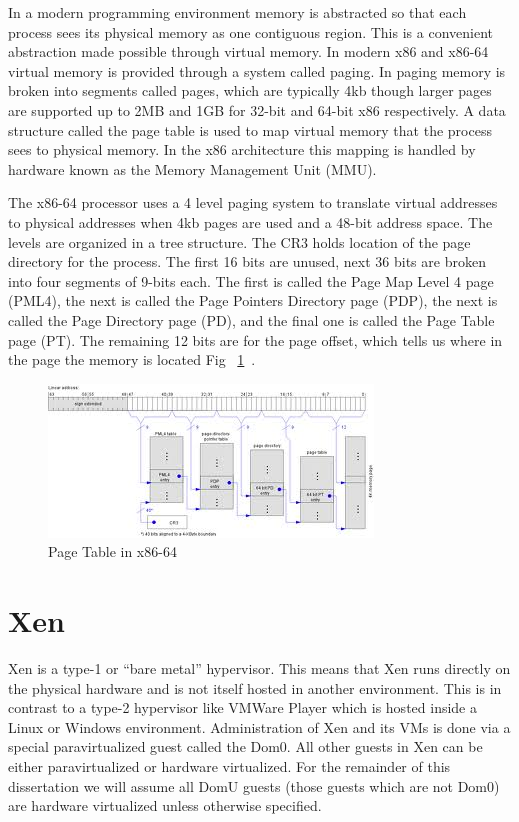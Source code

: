 In a modern programming environment memory is abstracted so that each process sees its physical memory as one contiguous region.  This is a convenient abstraction made possible through virtual memory. In modern x86 and x86-64 virtual memory is provided through a system called paging. In paging memory is broken into segments called pages, which are typically 4kb though larger pages are supported up to 2MB and 1GB for 32-bit and 64-bit x86 respectively. A data structure called the page table is used to map virtual memory that the process sees to physical memory. In the x86 architecture this mapping is handled by hardware known as the Memory Management Unit (MMU). 

The x86-64 processor uses a 4 level paging system to translate virtual addresses to physical addresses when 4kb pages are used and a 48-bit address space. The levels are organized in a tree structure. The CR3 holds location of the page directory for the process. The first 16 bits are unused, next 36 bits are broken into four segments of 9-bits each. The first is called the Page Map Level 4 page (PML4), the next is called the Page Pointers Directory page (PDP), the next is called the Page Directory page (PD), and the final one is called the Page Table page (PT). The remaining 12 bits are for the page offset, which tells us where in the page the memory is located Fig ~\ref{VirtPaging}~\cite{_file:x86_2009}. 

\begin{figure}\label{VirtPaging}
	  \centering
	  \includegraphics[width=\textwidth]{figures/PageTableDiagram.jpeg}
	  \caption{Page Table in x86-64 }
\end{figure}

\section{Xen}
Xen is a type-1 or ``bare metal'' hypervisor. This means that Xen runs directly on the physical hardware and is not itself hosted in another environment. This is in contrast to a type-2 hypervisor like VMWare Player which is hosted inside a Linux or Windows environment. Administration of Xen and its VMs is done via a special paravirtualized guest called the Dom0. All other guests in Xen can be either paravirtualized or hardware virtualized. For the remainder of this dissertation we will assume all DomU guests (those guests which are not Dom0) are hardware virtualized unless otherwise specified.


